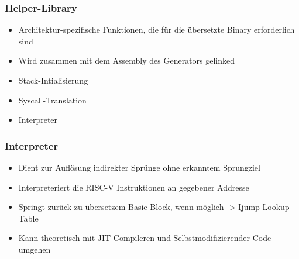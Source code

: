\begin{frame}
    \frametitle{Helper-Library}

    \begin{itemize}
        \item Architektur-spezifische Funktionen, die für die übersetzte Binary erforderlich sind
        \item Wird zusammen mit dem Assembly des Generators gelinked
        \item Stack-Intialisierung
        \item Syscall-Translation
        \item Interpreter
    \end{itemize}
\end{frame}
\clearpage

\begin{frame}
    \frametitle{Interpreter}
    \vspace{1cm}
    \begin{itemize}
        \setlength{\itemsep}{1em}
        \item Dient zur Auflösung indirekter Sprünge ohne erkanntem Sprungziel
        \item Interpreteriert die RISC-V Instruktionen an gegebener Addresse
        \item Springt zurück zu übersetzem Basic Block, wenn möglich -> Ijump Lookup Table
        \item Kann theoretisch mit JIT Compileren und Selbstmodifizierender Code umgehen
    \end{itemize}
\end{frame}
\clearpage

